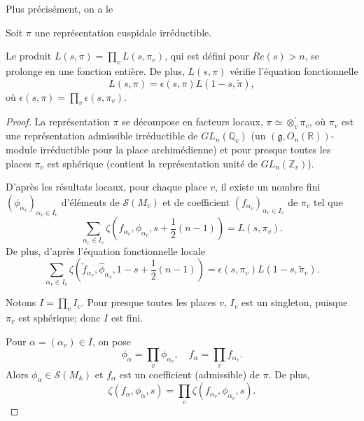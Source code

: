 Plus précisément, on a le
\begin{theoreme}
Soit $\pi$ une représentation cuspidale irréductible.

Le produit $L(s, \pi) = \prod_v L(s, \pi_v)$, qui est défini pour $Re(s) > n$, se prolonge en une fonction entière. De plus, $L(s, \pi)$ vérifie l'équation fonctionnelle
\begin{equation}
L(s,\pi) = \epsilon(s,\pi)L(1-s,\tilde{\pi}),
\end{equation}
où $\epsilon(s,\pi) = \prod_v \epsilon(s, \pi_v)$.
\end{theoreme}

\begin{proof}
La représentation $\pi$ se décompose en facteurs locaux,
$\pi \simeq \otimes_v^{'} \pi_v$, où $\pi_v$ est une représentation admissible irréductible de $GL_n(\mathbb{Q}_v)$ (un $(\mathfrak{g}, O_n(\mathbb{R}))$-module irréductible pour la place archimédienne) et pour presque toutes les places $\pi_v$ est sphérique (contient la représentation unité de $GL_n(\mathbb{Z}_v)$).

D'après les résultats locaux, pour chaque place $v$, il existe un nombre fini $(\phi_{\alpha_v})_{\alpha_v \in I_v}$ d'éléments de $\mathcal{S}(M_v)$ et de coefficient $(f_{\alpha_v})_{\alpha_v \in I_v}$ de $\pi_v$ tel que
\begin{equation}
\sum_{\alpha_v \in I_v} \zeta(f_{\alpha_v}, \phi_{\alpha_v}, s + \frac{1}{2}(n-1)) = L(s, \pi_v).
\end{equation}
De plus, d'après l'équation fonctionnelle locale
\begin{equation}
\sum_{\alpha_v \in I_v} \zeta(\check{f}_{\alpha_v}, \hat{\phi}_{\alpha_v}, 1-s + \frac{1}{2}(n-1)) = \epsilon(s,\pi_v)L(1-s, \tilde{\pi}_v).
\end{equation}

Notons $I = \prod_v I_v$. Pour presque toutes les places $v$, $I_v$ est un singleton, puisque $\pi_v$ est sphérique; donc $I$ est fini.

Pour $\alpha = (\alpha_v) \in I$, on pose
\begin{equation}
\phi_\alpha = \prod_v \phi_{\alpha_v}, \quad f_\alpha = \prod_v f_{\alpha_v}.
\end{equation}
Alors $\phi_\alpha \in \mathcal{S}(M_\mathbb{A})$ et $f_\alpha$ est un coefficient (admissible) de $\pi$. De plus,
\begin{equation}
\zeta(f_\alpha, \phi_\alpha, s) = \prod_v \zeta(f_{\alpha_v}, \phi_{\alpha_v}, s).
\end{equation}


\end{proof}
